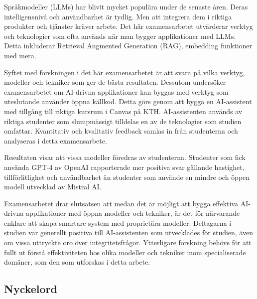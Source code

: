 Språkmodeller (LLMs) har blivit mycket populära under de senaste åren. Deras intelligensnivå och användbarhet är tydlig. Men att integrera dem i riktiga produkter och tjänster kräver arbete. Det här examensarbetet utvärderar verktyg och teknologier som ofta används när man bygger applikationer med LLMs. Detta inkluderar Retrieval Augmented Generation (RAG), embedding funktioner med mera.


Syftet med forskningen i det här examensarbetet är att svara på vilka verktyg, modeller och tekniker som ger de bästa resultaten. Dessutom undersöker examensarbetet om AI-drivna applikationer kan byggas med verktyg som uteslutande använder öppna källkod. Detta görs genom att bygga en AI-assistent med tillgång till riktiga kursrum i Canvas på KTH. AI-assistenten används av riktiga studenter som slumpmässigt tilldelas en av de teknologier som studien omfattar. Kvantitativ och kvalitativ feedback samlas in från studenterna och analyseras i detta examensarbete.


Resultaten visar att vissa modeller föredras av studenterna. Studenter som fick använda GPT-4 av OpenAI rapporterade mer positiva svar gällande hastighet, tillförlitlighet och användbarhet än studenter som använde en mindre och öppen modell utvecklad av Mistral AI.


Examensarbetet drar slutsatsen att medan det är möjligt att bygga effektiva AI-drivna applikationer med öppna modeller och tekniker, är det för närvarande enklare att skapa smartare system med proprietära modeller. Deltagarna i studien var generellt positiva till AI-assistenten som utvecklades för studien, även om vissa uttryckte oro över integritetsfrågor. Ytterligare forskning behövs för att fullt ut förstå effektiviteten hos olika modeller och tekniker inom specialiserade domäner, som den som utforskas i detta arbete.


\subsection*{Nyckelord}


\begin{scontents}[store-env=keywords,print-env=true]
\end{scontents}
